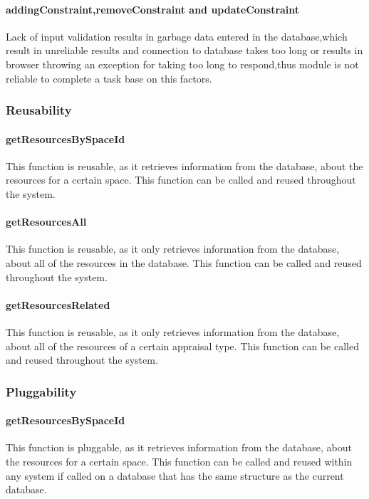 \documentclass[a4paper]{article}
\begin{document}
\paragraph{addingConstraint,removeConstraint and updateConstraint}
Lack of input validation results in garbage data entered in the database,which result in unreliable results and connection to database takes too long or results in browser throwing an exception for taking too long to respond,thus module is not reliable to complete a task base on this factors.


\subsubsection {Reusability}

\paragraph{getResourcesBySpaceId}
This function is reusable, as it retrieves information from the database, about the resources for a certain space. This function can be called and reused throughout the system.

\paragraph{getResourcesAll}
This function is reusable, as it only retrieves information from the database, about all of the resources in the database. This function can be called and reused throughout the system.

\paragraph{getResourcesRelated}
This function is reusable, as it only retrieves information from the database, about all of the resources of a certain appraisal type. This function can be called and reused throughout the system.

\subsubsection {Pluggability}

\paragraph{getResourcesBySpaceId}
This function is pluggable, as it retrieves information from the database, about the resources for a certain space. This function can be called and reused within any system if called on a database that has the same structure as the current database.
\end{document}
